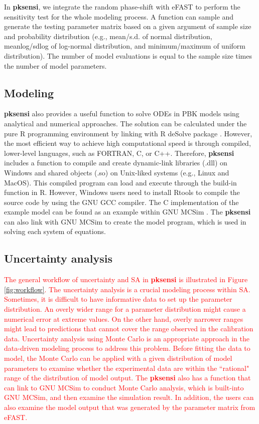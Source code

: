 \documentclass[preprint,12pt, a4paper]{elsarticle}
\begin{document}
In \textbf{pksensi}, we integrate the random phase-shift with eFAST to perform the sensitivity test for the whole modeling process. A function can sample and generate the testing parameter matrix based on a given argument of sample size and probability distribution (e.g., mean/s.d. of normal distribution, meanlog/sdlog of log-normal distribution, and minimum/maximum of uniform distribution). The number of model evaluations is equal to the sample size times the number of model parameters.


\subsection{Modeling}

\textbf{pksensi} also provides a useful function to solve ODEs in PBK models using analytical and numerical approaches. The solution can be calculated under the pure R programming environment by linking with R deSolve package \cite{JSSv033i09}. However, the most efficient way to achieve high computational speed is through compiled, lower-level languages, such as FORTRAN, C, or C++. Therefore, \textbf{pksensi} includes a function to compile and create dynamic-link libraries (.dll) on Windows and shared objects (.so) on Unix-liked systems (e.g., Linux and MacOS). This compiled program can load and execute through the build-in function in R. However, Windows users need to install Rtools to compile the source code by using the GNU GCC compiler. The C implementation of the example model can be found as an example within GNU MCSim \cite{bois2009gnu}. The \textbf{pksensi} can also link with GNU MCSim to create the model program, which is used in solving each system of equations. 


\subsection{Uncertainty analysis}

\textcolor{red}{The general workflow of uncertainty and SA in \textbf{pksensi} is illustrated in Figure \ref{fig:workflow}. The uncertainty analysis is a crucial modeling process within SA. Sometimes, it is difficult to have informative data to set up the parameter distribution. An overly wider range for a parameter distribution might cause a numerical error at extreme values. On the other hand, overly narrower ranges might lead to predictions that cannot cover the range observed in the calibration data. Uncertainty analysis using Monte Carlo is an appropriate approach in the data-driven modeling process to address this problem. Before fitting the data to model, the Monte Carlo can be applied with a given distribution of model parameters to examine whether the experimental data are within the ``rational" range of the distribution of model output. The \textbf{pksensi} also has a function that can link to GNU MCSim to conduct Monte Carlo analysis, which is built-into GNU MCSim, and then examine the simulation result. In addition, the users can also examine the model output that was generated by the parameter matrix from eFAST.}
\end{document}
